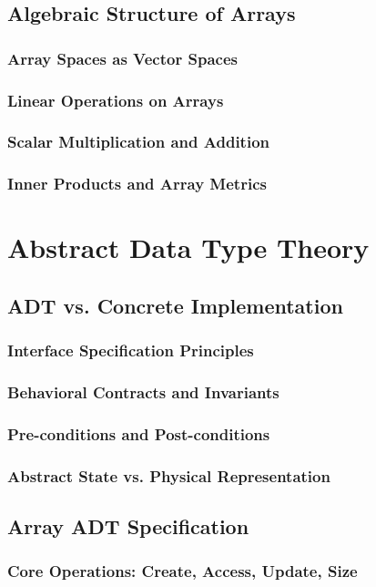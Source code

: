\documentclass[12pt, oneside]{book}
\begin{document}
\subsection{Algebraic Structure of Arrays}
\subsubsection{Array Spaces as Vector Spaces}
\subsubsection{Linear Operations on Arrays}
\subsubsection{Scalar Multiplication and Addition}
\subsubsection{Inner Products and Array Metrics}

\section{Abstract Data Type Theory}
\subsection{ADT vs. Concrete Implementation}
\subsubsection{Interface Specification Principles}
\subsubsection{Behavioral Contracts and Invariants}
\subsubsection{Pre-conditions and Post-conditions}
\subsubsection{Abstract State vs. Physical Representation}

\subsection{Array ADT Specification}
\subsubsection{Core Operations: Create, Access, Update, Size}
\end{document}
